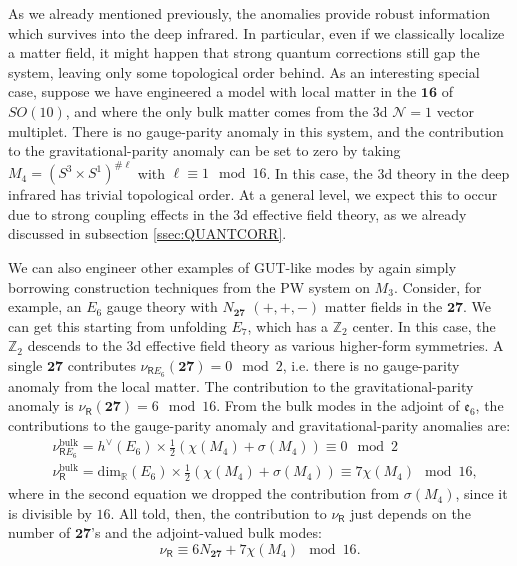 \documentclass[12pt]{article}%
\numberwithin{equation}{section}
\renewcommand{\(}{\left(}
\renewcommand{\)}{\right)}
\renewcommand{\[}{\left[}
\renewcommand{\]}{\right]}
\begin{document}
As we already mentioned previously, the anomalies provide robust information which survives into the deep infrared.
In particular, even if we classically localize a matter field, it might happen that strong quantum corrections still
gap the system, leaving only some topological order behind. As an interesting special case, suppose we have engineered a model
with local matter in the $\mathbf{16}$ of $SO(10)$, and where the only bulk matter comes from the 3d $\mathcal{N} = 1$
vector multiplet. There is no gauge-parity anomaly in this system, and the contribution to the gravitational-parity anomaly can be
set to zero by taking $M_4 = (S^{3} \times S^{1})^{\# \ell}$ with $\ell \equiv 1 \mod 16$. In this case, the 3d theory in the deep infrared
has trivial topological order. At a general level, we expect this to occur due to strong coupling effects in the 3d effective field theory, as we already discussed in subsection \ref{ssec:QUANTCORR}.

We can also engineer other examples of GUT-like modes by again simply borrowing construction techniques from the PW system on $M_3$.
Consider, for example, an $E_6$ gauge theory with $N_{\mathbf{27}}$ $(+,+,-)$ matter fields in the $\mathbf{27}$.
We can get this starting from unfolding $E_7$, which has a $\mathbb{Z}_2$ center. In this case, the $\mathbb{Z}_2$ descends to the 3d
effective field theory as various higher-form symmetries.
A single $\mathbf{27}$ contributes $\nu_{\mathsf{R}E_6}(\mathbf{27}) = 0 \mod 2$, i.e. there is no gauge-parity anomaly from the local matter. The contribution to the gravitational-parity anomaly is $\nu_{\mathsf{R}}(\mathbf{27}) = 6 \mod 16$.
From the bulk modes in the adjoint of $\mathfrak{e}_6$, the contributions to the
gauge-parity anomaly and gravitational-parity anomalies are:
\begin{align}
& \nu_{\mathsf{R} E_6}^{\mathrm{bulk}} = h^{\lor}(E_6) \times \frac{1}{2}(\chi(M_4) + \sigma(M_4)) \equiv 0 \mod 2 \\
& \nu_{\mathsf{R}}^{\mathrm{bulk}} = \mathrm{dim}_{\mathbb{R}}(E_6) \times \frac{1}{2}(\chi(M_4) + \sigma(M_4)) \equiv 7 \chi(M_4) \mod 16,
\end{align}
where in the second equation we dropped the contribution from $\sigma(M_4)$, since it is divisible by $16$.
All told, then, the contribution to $\nu_{\mathsf{R}}$ just depends on the number of $\mathbf{27}$'s
and the adjoint-valued bulk modes:
\begin{equation}
\nu_{\mathsf{R}} \equiv 6 N_{\mathbf{27}} + 7 \chi(M_4) \mod 16.
\end{equation}
\end{document}
